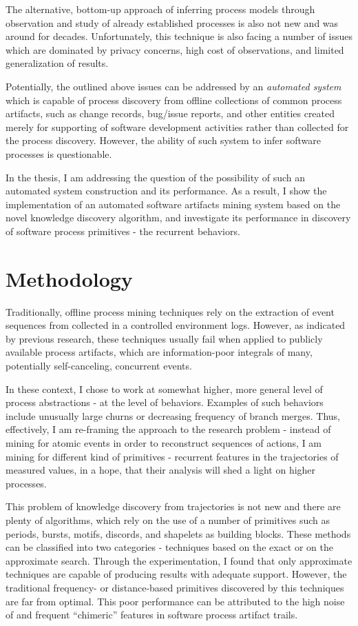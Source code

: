 \documentclass[12pt,oneside]{article}
\numberwithin{equation}{subsection}
\begin{document}
The alternative, bottom-up approach of inferring process models through observation and
study of already established processes is also not new and was around for decades. 
Unfortunately, this technique is also facing a number of issues which are dominated by privacy
concerns, high cost of observations, and limited generalization of results.

Potentially, the outlined above issues can be addressed by an \textit{automated system} which is
capable of process discovery from offline collections of common process artifacts, such as change
records, bug/issue reports, and other entities created merely for supporting of software development
activities rather than collected for the process discovery. However, the ability of such system to
infer software processes is questionable.

In the thesis, I am addressing the question of the possibility of such an automated system
construction and its performance. As a result, I show the implementation of an
automated software artifacts mining system based on the novel knowledge discovery algorithm,
and investigate its performance in discovery of software process primitives - the recurrent
behaviors.
\clearpage
 
\section{Methodology}
Traditionally, offline process mining techniques rely on the extraction of event sequences from
collected in a controlled environment logs. However, as indicated by previous research,
these techniques usually fail when applied to publicly available process artifacts, which are
information-poor integrals of many, potentially self-canceling, concurrent events. 

In these context, I chose to work at somewhat higher, more general level of process
abstractions - at the level of behaviors. Examples of such behaviors include unusually large churns
or decreasing frequency of branch merges. Thus, effectively, I am re-framing the approach to the
research problem - instead of mining for atomic events in order to reconstruct sequences of actions,
I am mining for different kind of primitives - recurrent features in the trajectories of
measured values, in a hope, that their analysis will shed a light on higher processes.

This problem of knowledge discovery from trajectories is not new and there are plenty of
algorithms, which rely on the use of a number of primitives such as periods, bursts,
motifs, discords, and shapelets as building blocks. These methods can be classified into two
categories - techniques based on the exact or on the approximate search. Through the
experimentation, I found that only approximate techniques are capable of producing results with
adequate support. However, the traditional frequency- or distance-based primitives discovered 
by this techniques are far from optimal. This poor performance can be attributed to the
high noise of and frequent ``chimeric'' features in software process artifact trails.
\end{document}
